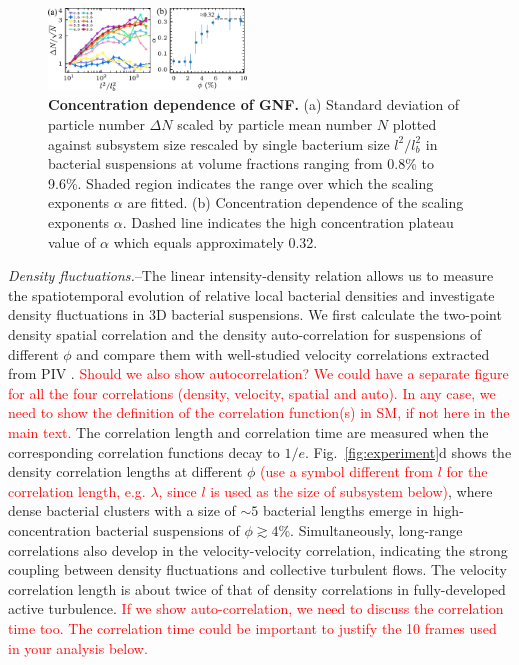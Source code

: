 \documentclass[twocolumn,aps,prl,amsmath,amssymb,longbibliography]{revtex4-2}
\begin{document}
\begin{figure}[ht]
\begin{center}
\includegraphics[width=0.47\textwidth]{figures/GNF/v1.pdf}
\caption[Concentration dependence of GNF.]
{
\textbf{Concentration dependence of GNF.}
(a) Standard deviation of particle number $\Delta N$ scaled by particle mean number $N$ plotted against subsystem size rescaled by single bacterium size $l^2/l_b^2$ in bacterial suspensions at volume fractions ranging from 0.8\% to 9.6\%. Shaded region indicates the range over which the scaling exponents $\alpha$ are fitted.
(b) Concentration dependence of the scaling exponents $\alpha$. Dashed line indicates the high concentration plateau value of $\alpha$ which equals approximately 0.32.
}
\label{fig:GNF}
\end{center}
\end{figure}


\textit{Density fluctuations.}--The linear intensity-density relation allows us to measure the spatiotemporal evolution of relative local bacterial densities and investigate density fluctuations in 3D bacterial suspensions. We first calculate the two-point density spatial correlation and the density auto-correlation for suspensions of different $\phi$ and compare them with well-studied velocity correlations extracted from PIV \cite{Liu2020}. \textcolor{red}{Should we also show autocorrelation? We could have a separate figure for all the four correlations (density, velocity, spatial and auto). In any case, we need to show the definition of the correlation function(s) in SM, if not here in the main text.} The correlation length and correlation time are measured when the corresponding correlation functions decay to $1/e$. Fig.~\ref{fig:experiment}d shows the density correlation lengths at different $\phi$ \textcolor{red}{(use a symbol different from $l$ for the correlation length, e.g. $\lambda$, since $l$ is used as the size of subsystem below)}, where dense bacterial clusters with a size of $\sim 5$ bacterial lengths emerge in high-concentration bacterial suspensions of $\phi \gtrsim 4\%$.
Simultaneously, long-range correlations also develop in the velocity-velocity correlation, indicating the strong coupling between density fluctuations and collective turbulent flows. The velocity correlation length is about twice of that of density correlations in fully-developed active turbulence. \textcolor{red}{If we show auto-correlation, we need to discuss the correlation time too. The correlation time could be important to justify the 10 frames used in your analysis below.}
\end{document}
